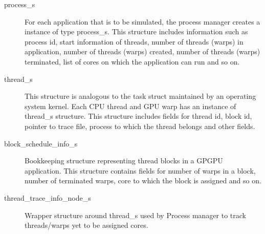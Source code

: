 \begin{description}

\item [process\_s] For each application that is to be simulated, the process manager
creates a instance of type process\_s. This structure includes information such
as process id, start information of threads, number of threads (warps) in
application, number of threads (warps) created, number of threads (warps)
  terminated, list of cores on which the application can run and so on.

\item [thread\_s] This structure is analogous to the task struct maintained by an
operating system kernel. Each CPU thread and GPU warp has an instance of
thread\_s structure. This structure includes fields for thread id, block id,
  pointer to trace file, process to which the thread belongs and other fields. 

\item [block\_schedule\_info\_s] Bookkeeping structure representing thread blocks in
a GPGPU application. This structure contains fields for number of warps in a
block, number of terminated warps, core to which the block is assigned and so
on.

\item [thread\_trace\_info\_node\_s] Wrapper structure around thread\_s used by
Process manager to track threads/warps yet to be assigned cores.

\end{description}

